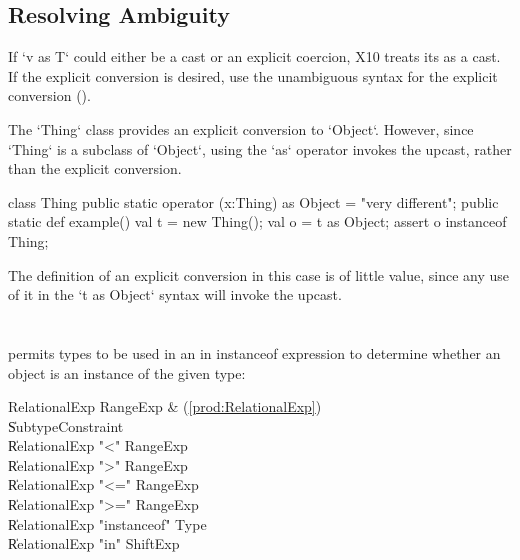 \subsection{Resolving Ambiguity}
\label{sect:ambig-cast}

If \xcd`v as T` could either be a cast or an explicit coercion, X10 treats its
as a cast.  If the explicit conversion is desired, use the unambiguous syntax
for the explicit conversion ().

\begin{ex}
The \xcd`Thing` class provides an explicit conversion to \xcd`Object`.
However, since \xcd`Thing` is a subclass of \xcd`Object`, 
using the \xcd`as` operator invokes the upcast, rather than the explicit
conversion.  
\begin{xten}
class Thing {
  public static operator (x:Thing) as Object = "very different";
  public static def example() {
    val t = new Thing();
    val o = t as Object;
    assert o instanceof Thing;
  }
}
\end{xten}
The definition of an explicit conversion in this case is of little value,
since any use of it in the \xcd`t as Object` syntax will invoke the upcast.  
\end{ex}

\section{}
\label{instanceOf}

\Xten{} permits types to be used in an in instanceof expression
to determine whether an object is an instance of the given type:

\begin{bbgrammar}
       RelationalExp \: RangeExp & (\ref{prod:RelationalExp}) \\
                    \| SubtypeConstraint \\
                    \| RelationalExp \xcd"<" RangeExp \\
                    \| RelationalExp \xcd">" RangeExp \\
                    \| RelationalExp \xcd"<=" RangeExp \\
                    \| RelationalExp \xcd">=" RangeExp \\
                    \| RelationalExp \xcd"instanceof" Type \\
                    \| RelationalExp \xcd"in" ShiftExp \\
\end{bbgrammar}

